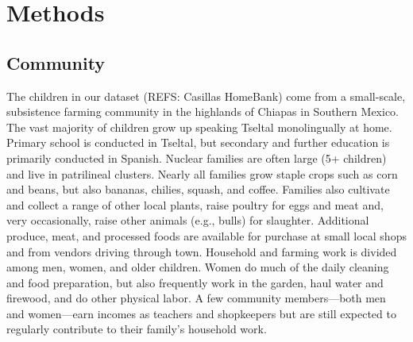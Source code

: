 \documentclass[man]{apa6}
\theoremstyle{definition}
\theoremstyle{definition}
\theoremstyle{definition}
\theoremstyle{remark}
\begin{document}
\hypertarget{methods}{\section{Methods}\label{methods}}

\subsection{Community}\label{methods-community}

The children in our dataset (REFS: Casillas HomeBank) come from a
small-scale, subsistence farming community in the highlands of Chiapas
in Southern Mexico. The vast majority of children grow up speaking
Tseltal monolingually at home. Primary school is conducted in Tseltal,
but secondary and further education is primarily conducted in Spanish.
Nuclear families are often large (5+ children) and live in patrilineal
clusters. Nearly all families grow staple crops such as corn and beans,
but also bananas, chilies, squash, and coffee. Families also cultivate
and collect a range of other local plants, raise poultry for eggs and
meat and, very occasionally, raise other animals (e.g., bulls) for
slaughter. Additional produce, meat, and processed foods are available
for purchase at small local shops and from vendors driving through town.
Household and farming work is divided among men, women, and older
children. Women do much of the daily cleaning and food preparation, but
also frequently work in the garden, haul water and firewood, and do
other physical labor. A few community members---both men and
women---earn incomes as teachers and shopkeepers but are still expected
to regularly contribute to their family's household work.
\end{document}
